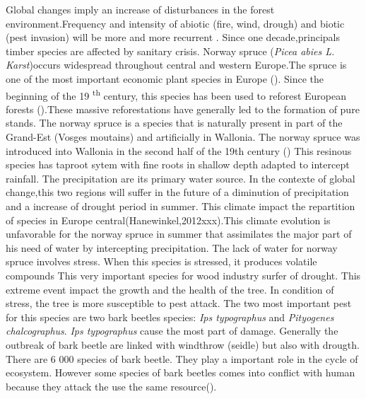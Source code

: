 \documentclass[3p,times]{elsarticle}
\begin{document}
Global changes imply an increase of disturbances in the forest environment.Frequency and intensity of abiotic (fire, wind, drough) and biotic (pest invasion) will be more and more recurrent \citep{Lindner_climate_2010}. Since one decade,principals timber species are affected by sanitary crisis.%
Norway spruce (\textit{Picea abies L. Karst})occurs widespread throughout central and western Europe.The spruce is one of the most important economic plant species in Europe (\citep{nystedt_norway_2013}).
 Since the beginning of the 19 \textsuperscript{th} century, this species has been used to reforest European forests (\citep{3PresentDistributionofSecondaryNorwaySpruceinEurope}).These massive reforestations have generally led to the formation of pure stands. The norway spruce is a species that is naturally present in part of the Grand-Est (Vosges moutains)  and artificially  in Wallonia. The norway spruce was introduced into Wallonia in the second half of the 19th century (\citep{Noirfalise_1975})%
 This resinous species has taproot sytem with fine roots in shallow depth adapted to intercept rainfall. The precipitation are its primary water source.
In the contexte of global change,this two regions will suffer in the future of a diminution of precipitation and a increase of drought period in summer. This climate impact the repartition of species in Europe central(Hanewinkel,2012xxx).This climate evolution is unfavorable for the norway spruce in summer that assimilates the major part of his need of water by intercepting precipitation. The lack of water for norway spruce involves stress. When this species is stressed, it produces volatile compounds %
This very important species for wood industry surfer of drought. This extreme event impact the growth and the health of the tree. In condition of stress, the tree is more susceptible to pest attack. The two most important pest for this species are two  bark beetles species: \textit{Ips typographus} and \textit{Pityogenes chalcographus}. \textit{Ips typographus} cause the most part of damage. Generally the outbreak of bark beetle are linked with windthrow (seidle) but also with drougth. There are 6 000 species of bark beetle. They play a important role in the cycle of ecosystem. However some species of bark beetles comes into conflict with human because they attack the use the same resource(\citep{raffa_natural_2015}).%
\end{document}

